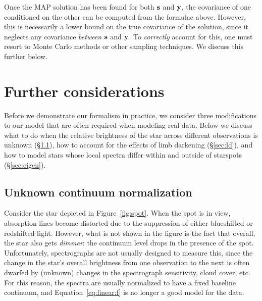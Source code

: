 \documentclass[modern]{aastex631}
\begin{document}
Once the MAP solution has been found for both ${\mathbf{s}}$ and ${\mathbf{y}}$, the covariance of one conditioned on the other can be computed from the formulae above. 
However, this is necessarily a lower bound on the true covariance of the solution, since it neglects any covariance \emph{between} ${\mathbf{s}}$ and ${\mathbf{y}}$. 
To \emph{correctly} account for this, one must resort to Monte Carlo methods or other sampling techniques. 
We discuss this further below.

\section{Further considerations}
\label{sec:bellswhistles}
%
Before we demonstrate our formalism in practice, we consider three modifications to our model that are often required when modeling real data. 
Below we discuss what to do when the relative brightness of the star across different observations is unknown (\S\ref{sec:norm}), how to account for the effects of limb darkening (\S\ref{sec:ld}), and how to model stars whose local spectra differ within and outside of starspots (\S\ref{sec:eigen}).

\subsection{Unknown continuum normalization}
\label{sec:norm}
%
Consider the star depicted in Figure~\ref{fig:spot}. 
When the spot is in view, absorption lines become distorted due to the suppression of either blueshifted or redshifted light. 
However, what is not shown in the figure is the fact that overall, the star also gets \emph{dimmer}: the continuum level drops in the presence of the spot. 
Unfortunately, spectrographs are not usually designed to measure this, since the change in the star's overall brightness from one observation to the next is often dwarfed by (unknown) changes in the spectrograph sensitivity, cloud cover, etc.
For this reason, the spectra are usually normalized to have a fixed baseline continuum, and Equation~\ref{eq:linear:f} is no longer a good model for the data.
\end{document}
